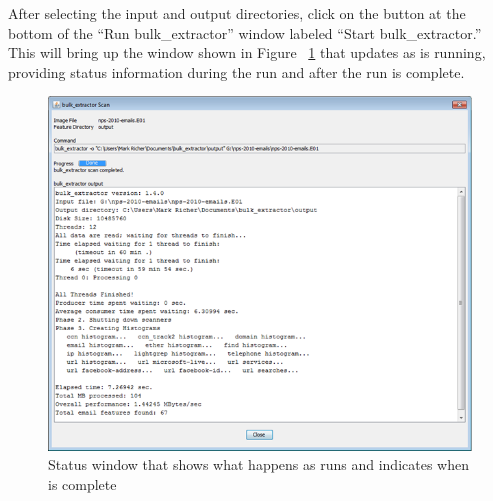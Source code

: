 \documentclass[11pt]{article} %
\begin{document}
After selecting the input and output directories, click on the button at the bottom of the ``Run bulk\_extractor'' window labeled ``Start bulk\_extractor.'' This will bring up the window shown in Figure ~\ref{fig:runCompleteStatus} that updates as \bulk is running, providing status information during the run and after the run is complete. \\
\begin{figure}
	\includegraphics{viewerPics/runCompleteStatus.png}
	\caption{Status window that shows what happens as \bulk runs and indicates when \bulk is complete}
	\label{fig:runCompleteStatus}
\end{figure}
\end{document}
